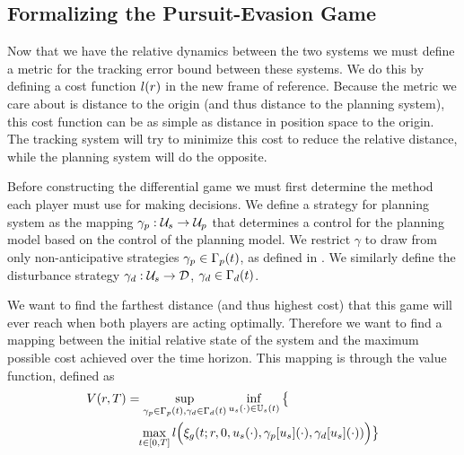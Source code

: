 \subsection{Formalizing the Pursuit-Evasion Game}
Now that we have the relative dynamics between the two systems we must define a metric for the tracking error bound between these systems. We do this by defining a cost function $l(r)$ in the new frame of reference. Because the metric we care about is distance to the origin (and thus distance to the planning system), this cost function can be as simple as distance in position space to the origin. The tracking system will try to minimize this cost to reduce the relative distance, while the planning system will do the opposite.

Before constructing the differential game we must first determine the method each player must use for making decisions. We define a strategy for planning system as the mapping $\gamma_{p} : \mathcal{U}_s \rightarrow \mathcal{U}_p$ that determines a control for the planning model based on the control of the planning model. We restrict $\gamma$ to draw from only non-anticipative strategies $\gamma_{p} \in \Gamma_p(t)$, as defined in \cite{Mitchell05}. We similarly define the disturbance strategy $\gamma_{d}: \mathcal{U}_s \rightarrow \mathcal{D}$, $\gamma_{d} \in \Gamma_d(t)$.

We want to find the farthest distance (and thus highest cost) that this game will ever reach when both players are acting optimally. Therefore we want to find a mapping between the initial relative state of the system and the maximum possible cost achieved over the time horizon. This mapping is through the value function, defined as
\begin{equation}
 \begin{aligned}
 \label{eq:valfunc}
 	&V(r,T)= \sup_{\gamma_{p} \in \Gamma_p(t), \gamma_{d} \in \Gamma_d(t)} \inf_{u_s(\cdot) \in \mathbb{U}_s(t)} \big\{\\
  &\qquad\qquad \max_{t\in [0, T]} l\Big(\xi_g(t; r, 0, u_s(\cdot), \gamma_p[u_s](\cdot), \gamma_d[u_s](\cdot))\Big)\big\}
 	\end{aligned}
 \end{equation} 


